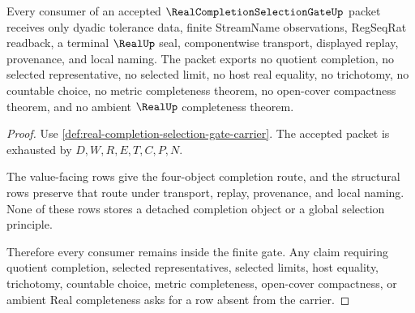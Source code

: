 \begin{theorem}
\label{thm:real-completion-selection-gate-nonescape}
Every consumer of an accepted $\RealCompletionSelectionGateUp$ packet receives only dyadic tolerance data, finite StreamName observations, RegSeqRat readback, a terminal $\RealUp$ seal, componentwise transport, displayed replay, provenance, and local naming. The packet exports no quotient completion, no selected representative, no selected limit, no host real equality, no trichotomy, no countable choice, no metric completeness theorem, no open-cover compactness theorem, and no ambient $\RealUp$ completeness theorem.
\end{theorem}
\begin{proof}
Use \autoref{def:real-completion-selection-gate-carrier}. The accepted packet is exhausted by $D,W,R,E,T,C,P,N$.

The value-facing rows give the four-object completion route, and the structural rows preserve that route under transport, replay, provenance, and local naming. None of these rows stores a detached completion object or a global selection principle.

Therefore every consumer remains inside the finite gate. Any claim requiring quotient completion, selected representatives, selected limits, host equality, trichotomy, countable choice, metric completeness, open-cover compactness, or ambient Real completeness asks for a row absent from the carrier.
\end{proof}




